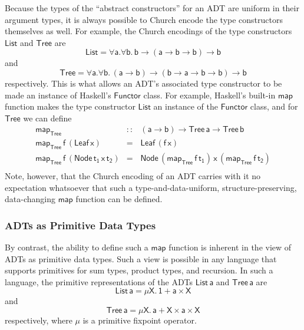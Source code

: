 \documentclass[acmsmall,screen,review,anonymous]{acmart}
\theoremstyle{definition}
\begin{document}
Because the types of the ``abstract constructors'' for an ADT are
uniform in their argument types, it is always possible to Church
encode the type constructors themselves as well. For example, the
Church encodings of the type constructors $\mathsf{List}$ and
$\mathsf{Tree}$ are
\[\mathsf{List} = \mathsf{\forall a. \forall b.\,b \to (a \to b \to b)
  \to b}\] 
and 
\[\mathsf{Tree} = \mathsf{\forall a. \forall b.\,(a \to b) \to (b \to
  a \to b \to b) \to b}\] respectively. This is what allows an ADT's
associated type constructor to be made an instance of Haskell's
$\mathsf{Functor}$ class. For example, Haskell's built-in
$\mathsf{map}$ function makes the type constructor $\mathsf{List}$ an
instance of the $\mathsf{Functor}$ class, and for $\mathsf{Tree}$ we
can define
\[\begin{array}{lll}
\mathsf{map_{Tree}} & \mathsf{::} & \mathsf{(a \to b) \to Tree\,a \to Tree \,b}\\
\mathsf{map_{Tree}\, f\, (Leaf\,x)} & \mathsf{=} & \mathsf{Leaf\,(f\,x)}\\
\mathsf{map_{Tree}\, f\, (Node\,t_1\,x\,t_2)} & \mathsf{=} &
\mathsf{Node\,(map_{Tree}\, f \,t_1)\,x\,(map_{Tree}\,f\,t_2)}\\
\end{array}\]
Note, however, that the Church encoding of an ADT carries with it no
expectation whatsoever that such a type-and-data-uniform,
structure-preserving, data-changing $\mathsf{map}$ function can be
defined.

\subsubsection{ADTs as Primitive Data Types}

By contrast, the ability to define such a $\mathsf{map}$ function is
inherent in the view of ADTs as primitive data types. Such a view is
possible in any language that supports primitives for sum types,
product types, and recursion. In such a language, the primitive
representations of the ADTs $\mathsf{List\,a}$ and $\mathsf{Tree\,a}$
are
\begin{equation}\label{eq:list}
  \mathsf{List\,a} = \mathsf{\mu X.\, 1 + a \times X}
\end{equation}
and 
\begin{equation}\label{eq:tree}
  \mathsf{Tree\,a} = \mathsf{\mu X.\, a + X \times a \times X}
\end{equation}
respectively, where $\mathsf{\mu}$ is a primitive fixpoint operator.
\end{document}
